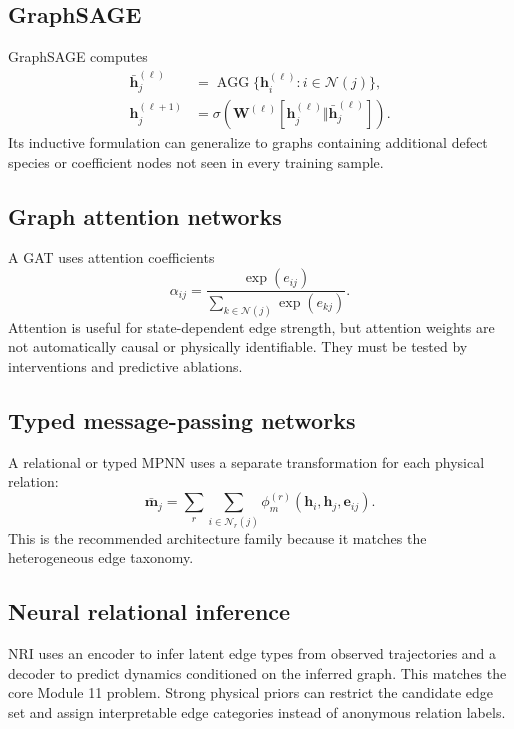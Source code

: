 \documentclass[11pt]{article}
\newcommand{\Wmat}{\bm{W}}
\newcommand{\hvec}{\bm{h}}
\newcommand{\mvec}{\bm{m}}
\newcommand{\evec}{\bm{e}}
\newcommand{\Agg}{\operatorname{AGG}}
\begin{document}
\subsection{GraphSAGE}

GraphSAGE computes
\begin{align}
\bar{\hvec}_j^{(\ell)}&=\Agg\{\hvec_i^{(\ell)}:i\in\mathcal{N}(j)\},\\
\hvec_j^{(\ell+1)}&=\sigma\left(\Wmat^{(\ell)}[\hvec_j^{(\ell)}\Vert\bar{\hvec}_j^{(\ell)}]\right).
\end{align}
Its inductive formulation can generalize to graphs containing additional defect species or coefficient nodes not seen in every training sample.

\subsection{Graph attention networks}

A GAT uses attention coefficients
\begin{equation}
\alpha_{ij}=\frac{\exp(e_{ij})}{\sum_{k\in\mathcal{N}(j)}\exp(e_{kj})}.
\end{equation}
Attention is useful for state-dependent edge strength, but attention weights are not automatically causal or physically identifiable. They must be tested by interventions and predictive ablations.

\subsection{Typed message-passing networks}

A relational or typed MPNN uses a separate transformation for each physical relation:
\begin{equation}
\bar{\mvec}_j=\sum_r\sum_{i\in\mathcal{N}_r(j)}\phi_m^{(r)}(\hvec_i,\hvec_j,\evec_{ij}).
\end{equation}
This is the recommended architecture family because it matches the heterogeneous edge taxonomy.

\subsection{Neural relational inference}

NRI uses an encoder to infer latent edge types from observed trajectories and a decoder to predict dynamics conditioned on the inferred graph. This matches the core Module 11 problem. Strong physical priors can restrict the candidate edge set and assign interpretable edge categories instead of anonymous relation labels.
\end{document}

